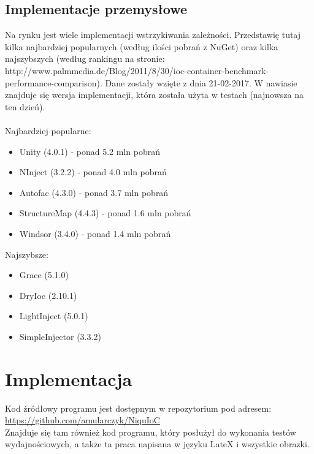 \documentclass[12pt]{article}
\begin{document}
\subsection{Implementacje przemysłowe}
Na rynku jest wiele implementacji wstrzykiwania zależności. Przedstawię tutaj kilka najbardziej popularnych (według ilości pobrań z NuGet) oraz kilka najszybszych (według rankingu na stronie: http://www.palmmedia.de/Blog/2011/8/30/ioc-container-benchmark-performance-comparison). Dane zostały wzięte z dnia 21-02-2017. W nawiasie znajduje się wersja implementacji, która została użyta w testach (najnowsza na ten dzień).\\
\\
Najbardziej popularne:
\begin{itemize}
	\item Unity (4.0.1) - ponad 5.2 mln pobrań
	\item NInject (3.2.2) - ponad 4.0 mln pobrań
	\item Autofac (4.3.0) - ponad 3.7 mln pobrań
	\item StructureMap (4.4.3) - ponad 1.6 mln pobrań
	\item Windsor (3.4.0) - ponad 1.4 mln pobrań
\end{itemize}
Najszybsze:
\begin{itemize}
	\item Grace (5.1.0)
	\item DryIoc (2.10.1)
	\item LightInject (5.0.1)
	\item SimpleInjector (3.3.2)
\end{itemize}



\clearpage
\section{Implementacja}
Kod źródłowy programu jest dostępnym w repozytorium pod adresem:\\
\url{https://github.com/amularczyk/NiquIoC}\\
Znajduje się tam również kod programu, który posłużył do wykonania testów wydajnościowych, a także ta praca napisana w języku LateX i wszystkie obrazki.
\end{document}
